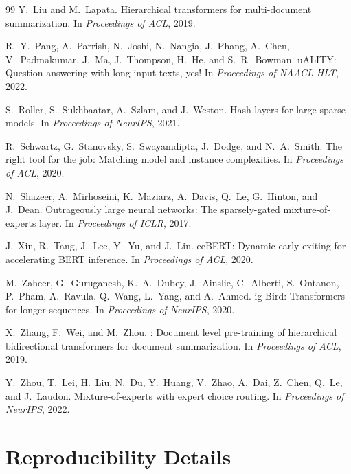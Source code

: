 \documentclass[11pt,a4paper]{article}
\begin{document}
\begin{thebibliography}{99}
Y.~Liu and M.~Lapata.
\newblock Hierarchical transformers for multi-document summarization.
\newblock In {\em Proceedings of ACL}, 2019.

R.~Y.~Pang, A.~Parrish, N.~Joshi, N.~Nangia, J.~Phang, A.~Chen, V.~Padmakumar,
  J.~Ma, J.~Thompson, H.~He, and S.~R.~Bowman.
u{ALITY}: Question answering with long input texts, yes!
\newblock In {\em Proceedings of NAACL-HLT}, 2022.

S.~Roller, S.~Sukhbaatar, A.~Szlam, and J.~Weston.
\newblock Hash layers for large sparse models.
\newblock In {\em Proceedings of NeurIPS}, 2021.

R.~Schwartz, G.~Stanovsky, S.~Swayamdipta, J.~Dodge, and N.~A.~Smith.
\newblock The right tool for the job: Matching model and instance complexities.
\newblock In {\em Proceedings of ACL}, 2020.

N.~Shazeer, A.~Mirhoseini, K.~Maziarz, A.~Davis, Q.~Le, G.~Hinton, and
  J.~Dean.
\newblock Outrageously large neural networks: The sparsely-gated
  mixture-of-experts layer.
\newblock In {\em Proceedings of ICLR}, 2017.

J.~Xin, R.~Tang, J.~Lee, Y.~Yu, and J.~Lin.
ee{BERT}: Dynamic early exiting for accelerating {BERT} inference.
\newblock In {\em Proceedings of ACL}, 2020.

M.~Zaheer, G.~Guruganesh, K.~A.~Dubey, J.~Ainslie, C.~Alberti, S.~Ontanon,
  P.~Pham, A.~Ravula, Q.~Wang, L.~Yang, and A.~Ahmed.
ig {B}ird: Transformers for longer sequences.
\newblock In {\em Proceedings of NeurIPS}, 2020.

X.~Zhang, F.~Wei, and M.~Zhou.
: Document level pre-training of hierarchical bidirectional
  transformers for document summarization.
\newblock In {\em Proceedings of ACL}, 2019.

Y.~Zhou, T.~Lei, H.~Liu, N.~Du, Y.~Huang, V.~Zhao, A.~Dai, Z.~Chen,
  Q.~Le, and J.~Laudon.
\newblock Mixture-of-experts with expert choice routing.
\newblock In {\em Proceedings of NeurIPS}, 2022.

\end{thebibliography}

\appendix
\section{Reproducibility Details}
\label{sec:appendix}
\end{document}
